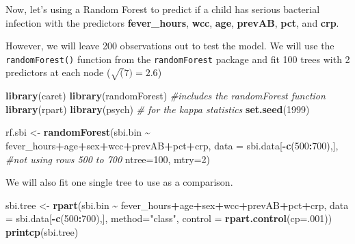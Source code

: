 \documentclass[
]{book}
\newenvironment{Shaded}{\begin{snugshade}}{\end{snugshade}}
\newcommand{\AttributeTok}[1]{\textcolor[rgb]{0.13,0.29,0.53}{#1}}
\newcommand{\CommentTok}[1]{\textcolor[rgb]{0.56,0.35,0.01}{\textit{#1}}}
\newcommand{\DecValTok}[1]{\textcolor[rgb]{0.00,0.00,0.81}{#1}}
\newcommand{\FunctionTok}[1]{\textcolor[rgb]{0.13,0.29,0.53}{\textbf{#1}}}
\newcommand{\NormalTok}[1]{#1}
\newcommand{\OtherTok}[1]{\textcolor[rgb]{0.56,0.35,0.01}{#1}}
\newcommand{\SpecialCharTok}[1]{\textcolor[rgb]{0.81,0.36,0.00}{\textbf{#1}}}
\newcommand{\StringTok}[1]{\textcolor[rgb]{0.31,0.60,0.02}{#1}}
\begin{document}
Now, let's using a Random Forest to predict if a child has serious bacterial
infection with the predictors \textbf{fever\_hours}, \textbf{wcc}, \textbf{age}, \textbf{prevAB},
\textbf{pct}, and \textbf{crp}.

However, we will leave 200 observations out to test the model. We will
use the \texttt{randomForest()} function from the \texttt{randomForest} package and fit
100 trees with 2 predictors at each node (\(\sqrt(7)=2.6\))

\begin{Shaded}
\begin{Highlighting}[]
\FunctionTok{library}\NormalTok{(caret)}
\FunctionTok{library}\NormalTok{(randomForest)  }\CommentTok{\#includes the randomForest function }
\FunctionTok{library}\NormalTok{(rpart)}
\FunctionTok{library}\NormalTok{(psych) }\CommentTok{\# for the kappa statistics}
\FunctionTok{set.seed}\NormalTok{(}\DecValTok{1999}\NormalTok{)}

\NormalTok{rf.sbi }\OtherTok{\textless{}{-}} \FunctionTok{randomForest}\NormalTok{(sbi.bin }\SpecialCharTok{\textasciitilde{}}\NormalTok{ fever\_hours}\SpecialCharTok{+}\NormalTok{age}\SpecialCharTok{+}\NormalTok{sex}\SpecialCharTok{+}\NormalTok{wcc}\SpecialCharTok{+}\NormalTok{prevAB}\SpecialCharTok{+}\NormalTok{pct}\SpecialCharTok{+}\NormalTok{crp,}
                  \AttributeTok{data =}\NormalTok{ sbi.data[}\SpecialCharTok{{-}}\FunctionTok{c}\NormalTok{(}\DecValTok{500}\SpecialCharTok{:}\DecValTok{700}\NormalTok{),],      }\CommentTok{\#not using rows 500 to 700}
                  \AttributeTok{ntree=}\DecValTok{100}\NormalTok{, }\AttributeTok{mtry=}\DecValTok{2}\NormalTok{)}
\end{Highlighting}
\end{Shaded}

We will also fit one single tree to use as a comparison.

\begin{Shaded}
\begin{Highlighting}[]
\NormalTok{sbi.tree }\OtherTok{\textless{}{-}} \FunctionTok{rpart}\NormalTok{(sbi.bin }\SpecialCharTok{\textasciitilde{}}\NormalTok{ fever\_hours}\SpecialCharTok{+}\NormalTok{age}\SpecialCharTok{+}\NormalTok{sex}\SpecialCharTok{+}\NormalTok{wcc}\SpecialCharTok{+}\NormalTok{prevAB}\SpecialCharTok{+}\NormalTok{pct}\SpecialCharTok{+}\NormalTok{crp,}
                  \AttributeTok{data =}\NormalTok{ sbi.data[}\SpecialCharTok{{-}}\FunctionTok{c}\NormalTok{(}\DecValTok{500}\SpecialCharTok{:}\DecValTok{700}\NormalTok{),], }\AttributeTok{method=}\StringTok{"class"}\NormalTok{, }
                  \AttributeTok{control =} \FunctionTok{rpart.control}\NormalTok{(}\AttributeTok{cp=}\NormalTok{.}\DecValTok{001}\NormalTok{))}
\FunctionTok{printcp}\NormalTok{(sbi.tree)}
\end{Highlighting}
\end{Shaded}
\end{document}
